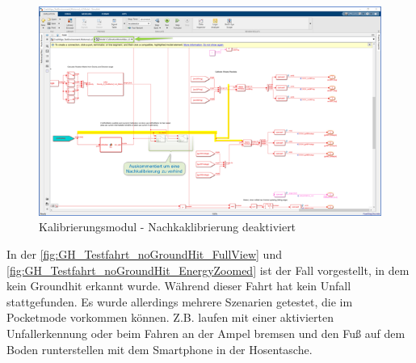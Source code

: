 \begin{figure}[H]
	\centering
	\includegraphics[width=\linewidth]{Bilder/KalibModul_Nachkaklib_deaktiviert.png}
	\caption{Kalibrierungsmodul - Nachkaklibrierung deaktiviert}
	\label{fig:KalibModul_Nachkaklib_deaktiviert}
\end{figure}
In der \autoref{fig:GH_Testfahrt_noGroundHit_FullView} und \autoref{fig:GH_Testfahrt_noGroundHit_EnergyZoomed} ist der Fall vorgestellt, in dem kein Groundhit erkannt wurde. Während dieser Fahrt hat kein Unfall stattgefunden. Es wurde allerdings mehrere Szenarien getestet, die im Pocketmode vorkommen können. Z.B. laufen mit einer aktivierten Unfallerkennung oder beim Fahren an der Ampel bremsen und den Fuß auf dem Boden runterstellen mit dem Smartphone in der Hosentasche.


